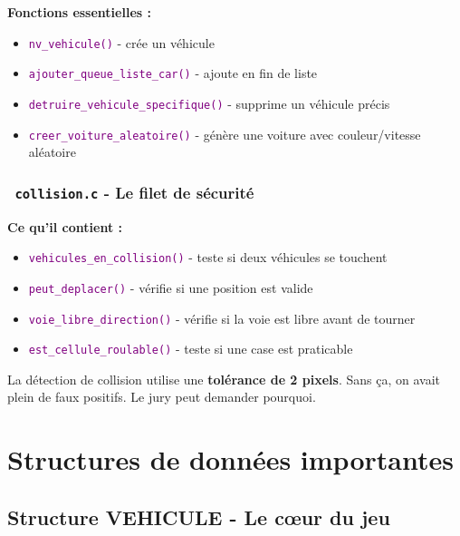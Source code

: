 \documentclass[11pt,a4paper]{article}
\newcommand{\fichier}[1]{\texttt{\textcolor{primary}{\faIcon{file-code} #1}}}
\newcommand{\fonction}[1]{\texttt{\textcolor{purple}{#1()}}}
\newcommand{\important}[1]{\textcolor{accent}{\textbf{#1}}}
\begin{document}
\textbf{Fonctions essentielles :}
\begin{itemize}[noitemsep]
    \item \fonction{nv\_vehicule} - crée un véhicule
    \item \fonction{ajouter\_queue\_liste\_car} - ajoute en fin de liste
    \item \fonction{detruire\_vehicule\_specifique} - supprime un véhicule précis
    \item \fonction{creer\_voiture\_aleatoire} - génère une voiture avec couleur/vitesse aléatoire
\end{itemize}

\subsubsection{\fichier{collision.c} - Le filet de sécurité}

\textbf{Ce qu'il contient :}
\begin{itemize}[noitemsep]
    \item \fonction{vehicules\_en\_collision} - teste si deux véhicules se touchent
    \item \fonction{peut\_deplacer} - vérifie si une position est valide
    \item \fonction{voie\_libre\_direction} - vérifie si la voie est libre avant de tourner
    \item \fonction{est\_cellule\_roulable} - teste si une case est praticable
\end{itemize}

\begin{dangerbox}
La détection de collision utilise une \important{tolérance de 2 pixels}. Sans ça, on avait plein de faux positifs. Le jury peut demander pourquoi.
\end{dangerbox}

\section{Structures de données importantes}

\subsection{Structure VEHICULE - Le cœur du jeu}
\end{document}
